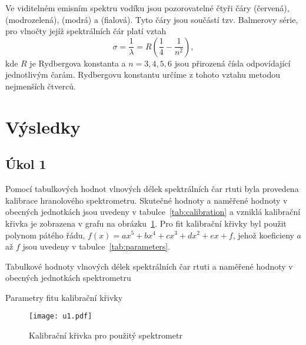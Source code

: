 \documentclass{scirep}
\begin{document}
    Ve viditelném emisním spektru vodíku jsou pozorovatelné čtyři čáry  (červená),  (modrozelená),  (modrá) a  (fialová).
    Tyto čáry jsou součástí tzv. Balmerovy série, pro vlnočty jejíž spektrálních čár platí vztah
    \begin{equation}
        \label{eq:rydberg}
        \sigma = \frac{1}{\lambda} = R \left( \frac{1}{4} - \frac{1}{n^2} \right),
    \end{equation}
    kde $R$ je Rydbergova konstanta a $n = 3, 4, 5, 6$ jsou přirozená čísla odpovídající jednotlivým čarám.
    Rydbergovu konstantu určíme z tohoto vztahu metodou nejmenších čtverců.



    \section*{Výsledky}

    \subsection*{Úkol 1}

    Pomocí tabulkových hodnot vlnových délek spektrálních čar rtuti byla provedena kalibrace hranolového spektrometru.
    Skutečné hodnoty a naměřené hodnoty v obecných jednotkách jsou uvedeny v tabulce~\ref{tab:calibration} a vzniklá kalibrační křivka je zobrazena v grafu na obrázku~\ref{fig:u1}.
    Pro fit kalibrační křivky byl použit polynom pátého řádu, $f(x) = ax^5 + bx^4 + cx^3 + dx^2 + ex + f$, jehož koeficieny $a$ až $f$ jsou uvedeny v tabulce~\ref{tab:parameters}.

    \begin{table}[b]
        \centering
        \setlength{\tabcolsep}{15pt}
        
        \caption{Tabulkové hodnoty vlnových délek spektrálních čar rtuti a naměřené hodnoty v obecných jednotkách spektrometru}
        \label{tab:calibration}
    \end{table}

    \begin{table}[b]
        \centering
        \setlength{\tabcolsep}{15pt}
        
        \caption{Parametry fitu kalibrační křivky}
        \label{tab:parameters}
    \end{table}

    \begin{figure}[b]
        \centering
        \texttt{[image: u1.pdf]}
        \caption{Kalibrační křivka pro použitý spektrometr}
        \label{fig:u1}
    \end{figure}
\end{document}

